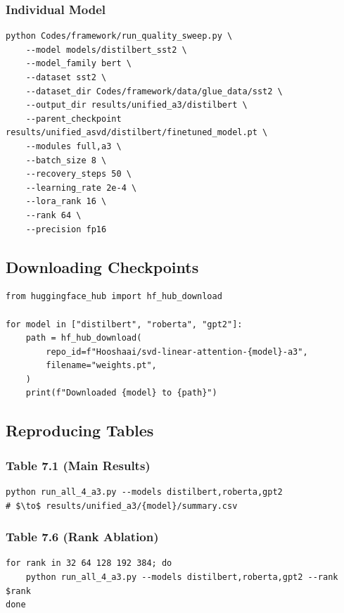 \subsubsection{Individual Model}

\begin{lstlisting}
python Codes/framework/run_quality_sweep.py \
    --model models/distilbert_sst2 \
    --model_family bert \
    --dataset sst2 \
    --dataset_dir Codes/framework/data/glue_data/sst2 \
    --output_dir results/unified_a3/distilbert \
    --parent_checkpoint results/unified_asvd/distilbert/finetuned_model.pt \
    --modules full,a3 \
    --batch_size 8 \
    --recovery_steps 50 \
    --learning_rate 2e-4 \
    --lora_rank 16 \
    --rank 64 \
    --precision fp16
\end{lstlisting}

\subsection{Downloading Checkpoints}

\begin{lstlisting}
from huggingface_hub import hf_hub_download

for model in ["distilbert", "roberta", "gpt2"]:
    path = hf_hub_download(
        repo_id=f"Hooshaai/svd-linear-attention-{model}-a3",
        filename="weights.pt",
    )
    print(f"Downloaded {model} to {path}")
\end{lstlisting}

\subsection{Reproducing Tables}

\subsubsection{Table 7.1 (Main Results)}

\begin{lstlisting}
python run_all_4_a3.py --models distilbert,roberta,gpt2
# $\to$ results/unified_a3/{model}/summary.csv
\end{lstlisting}

\subsubsection{Table 7.6 (Rank Ablation)}

\begin{lstlisting}
for rank in 32 64 128 192 384; do
    python run_all_4_a3.py --models distilbert,roberta,gpt2 --rank $rank
done
\end{lstlisting}


